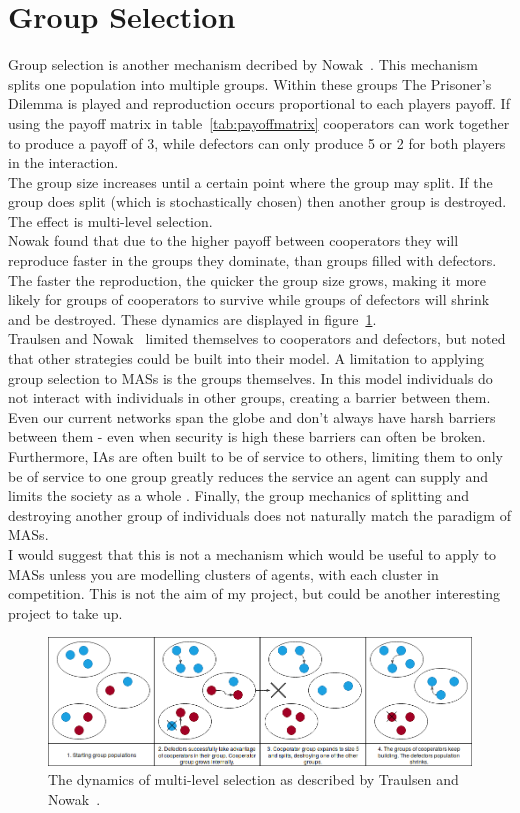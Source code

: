 \documentclass[]{final_report}
\begin{document}
\section{Group Selection}
Group selection is another mechanism decribed by Nowak~\cite{five_rules_coop}. This mechanism splits one population into multiple groups. Within these groups The Prisoner's Dilemma is played and reproduction occurs proportional to each players payoff. If using the payoff matrix in table~\ref{tab:payoffmatrix} cooperators can work together to produce a payoff of 3, while defectors can only produce 5 or 2 for both players in the interaction.\\
The group size increases until a certain point where the group may split. If the group does split (which is stochastically chosen) then another group is destroyed. The effect is multi-level selection.\\
Nowak found that due to the higher payoff between cooperators they will reproduce faster in the groups they dominate, than groups filled with defectors. The faster the reproduction, the quicker the group size grows, making it more likely for groups of cooperators to survive while groups of defectors will shrink and be destroyed. These dynamics are displayed in figure~\ref{fig:group}.\\
Traulsen and Nowak~\cite{multilevel_nowak} limited themselves to cooperators and defectors, but noted that other strategies could be built into their model. A limitation to applying group selection to MASs is the groups themselves. In this model individuals do not interact with individuals in other groups, creating a barrier between them.\\
Even our current networks span the globe and don't always have harsh barriers between them - even when security is high these barriers can often be broken. Furthermore, IAs are often built to be of service to others, limiting them to only be of service to one group greatly reduces the service an agent can supply and limits the society as a whole . Finally, the group mechanics of splitting and destroying another group of individuals does not naturally match the paradigm of MASs.\\
I would suggest that this is not a mechanism which would be useful to apply to MASs unless you are modelling clusters of agents, with each cluster in competition. This is not the aim of my project, but could be another interesting project to take up.
\begin{figure}
	\center
	\includegraphics[width=\textwidth]{GroupSelection.png}
	\caption{The dynamics of multi-level selection as described by Traulsen and Nowak~\cite{multilevel_nowak}.}
	\label{fig:group}
\end{figure}
\end{document}
